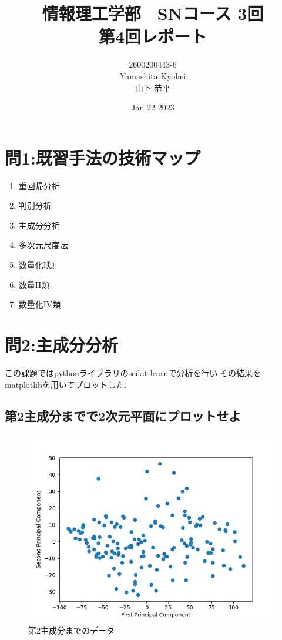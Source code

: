 \documentclass[dvipdfmx,autodetect-engine,titlepage]{jsarticle}
\title{情報理工学部　SNコース 3回\\
第4回レポート}
\author{2600200443-6\\Yamashita Kyohei\\山下 恭平}
\date{Jan 22 2023}
\begin{document}
\maketitle

\section{問1:既習手法の技術マップ}

\begin{enumerate}
  \item 重回帰分析
  \item 判別分析
  \item 主成分分析
  \item 多次元尺度法
  \item 数量化I類
  \item 数量II類
  \item 数量化IV類
\end{enumerate}

\section{問2:主成分分析}

この課題ではpythonライブラリのscikit-learnで分析を行い,その結果を
matplotlibを用いてプロットした.

\subsection{第2主成分までで2次元平面にプロットせよ}

\begin{figure}[h]
  \centering
  \includegraphics[scale=0.7]{Figure_1.png}
  \caption{第2主成分までのデータ}
\end{figure}
\end{document}
